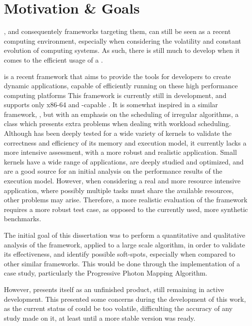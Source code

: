 \documentclass[main.tex]{subfiles}
\begin{document}
\section{Motivation \& Goals}

\hetplats, and consequentely frameworks targeting them, can still be seen as a recent computing environment, especially when considering the volatility and constant evolution of computing systems. As such, there is still much to develop when it comes to the efficient usage of a \hetplat.

\gama is a recent framework that aims to provide the tools for developers to create dynamic applications, capable of efficiently running on these high performance computing platforms \cite{joao2012gama}
This framework is currently still in development, and supports only x86-64 \cpus and \cuda-capable \gpus. It is somewhat inspired in a similar framework, \starpu, but with an emphasis on the scheduling of irregular algorithms, a class which presents extra problems when dealing with workload scheduling. Although \gama has been deeply tested for a wide variety of kernels to validate the correctness and efficiency of its memory and execution model, it currently lacks a more intensive assessment, with a more robust and realistic application.
Small kernels have a wide range of applications, are deeply studied and optimized, and are a good source for an initial analysis on the performance results of the execution model. However, when considering a real and more resource intensive application, where possibly multiple tasks must share the available resources, other problems may arise. Therefore, a more realistic evaluation of the framework requires a more robust test case, as opposed to the currently used, more synthetic benchmarks.

The initial goal of this dissertation was to perform a quantitative and qualitative analysis of the \gama framework, applied to a large scale algorithm, in order to validate its effectiveness, and identify possible soft-spots, especially when compared to other similar frameworks. This would be done through the implementation of a case study, particularly the Progressive Photon Mapping Algorithm.

However, \gama presents itself as an unfinished product, still remaining in active development. This presented some concerns during the development of this work, as the current status of \gama could be too volatile, difficulting the accuracy of any study made on it, at least until a more stable version was ready.
\end{document}
